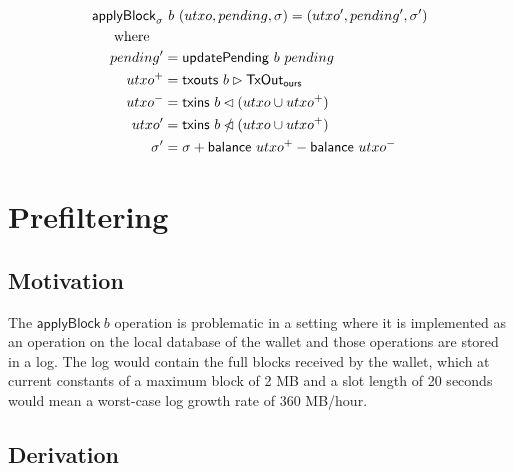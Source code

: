 \documentclass{article}
\newcommand{\restrictdom}{\lhd}
\newcommand{\subtractdom}{\mathbin{\slashed{\restrictdom}}}
\newcommand{\restrictrange}{\rhd}
\begin{document}
\begin{equation*}
\begin{split}
\mathsf{applyBlock}_\sigma & ~ b ~ (utxo, pending, \sigma) = (utxo^\prime, pending^\prime, \sigma^\prime) \\
\text{where} \quad \\
    pending^\prime & = \mathsf{updatePending} ~ b ~ pending \\
    utxo^+ & = \mathsf{txouts} ~ b \restrictrange \mathsf{TxOut_{ours}} \\
    utxo^- & = \mathsf{txins} ~ b \restrictdom (utxo \cup utxo^+) \\
    utxo^\prime & = \mathsf{txins} ~ b \subtractdom (utxo \cup utxo^+) \\
    \sigma^\prime & = \sigma + \mathsf{balance} ~ utxo^+ - \mathsf{balance} ~ utxo^- \\
\end{split}
\end{equation*}

\section{Prefiltering}
\label{sec:prefiltering}

\subsection{Motivation}

The $\mathsf{applyBlock} ~ b$ operation is problematic in a setting where it is
implemented as an operation on the local database of the wallet and those
operations are stored in a log. The log would contain the full blocks received
by the wallet, which at current constants of a maximum block of 2 MB and a slot
length of 20 seconds would mean a worst-case log growth rate of 360 MB/hour.

\subsection{Derivation}
\end{document}

